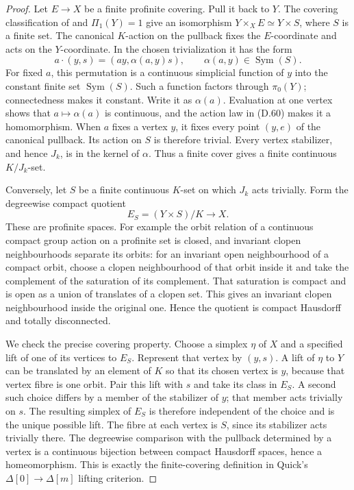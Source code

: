 \begin{proof}
Let $E\to X$ be a finite profinite covering.  Pull it
back to $Y$.  The covering classification of
\cite[\S2.1, Proposition 2.2]{D_Quick2008} and
$\Pi_1(Y)=1$ give an isomorphism
$Y\times_X E\simeq Y\times S$, where $S$ is a finite
set.  The canonical $K$-action on the pullback fixes
the $E$-coordinate and acts on the $Y$-coordinate.
In the chosen trivialization it has the form
\[
       a\cdot(y,s)=(ay,\alpha(a,y)s),
       \qquad \alpha(a,y)\in\operatorname{Sym}(S).           \tag{D.60}
\]
For fixed $a$, this permutation is a continuous
simplicial function of $y$ into the constant finite
set $\operatorname{Sym}(S)$.  Such a function factors
through $\pi_0(Y)$; connectedness makes it constant.
Write it as $\alpha(a)$.  Evaluation at one vertex
shows that $a\mapsto\alpha(a)$ is continuous, and
the action law in (D.60) makes it a homomorphism.
When $a$ fixes a vertex $y$, it fixes every point
$(y,e)$ of the canonical pullback.  Its action on
$S$ is therefore trivial.  Every vertex stabilizer,
and hence $J_k$, is in the kernel of $\alpha$.
Thus a finite cover gives a finite continuous
$K/J_k$-set.

Conversely, let $S$ be a finite continuous $K$-set
on which $J_k$ acts trivially.  Form the degreewise
compact quotient
\[
                       E_S=(Y\times S)/K\longrightarrow X.
\]
These are profinite spaces.  For example the orbit
relation of a continuous compact group action on
a profinite set is closed, and invariant clopen
neighbourhoods separate its orbits: for an invariant
open neighbourhood of a compact orbit, choose a
clopen neighbourhood of that orbit inside it and
take the complement of the saturation of its
complement.  That saturation is compact and is
open as a union of translates of a clopen set.
This gives an invariant clopen
neighbourhood inside the original one.  Hence the
quotient is compact Hausdorff and totally disconnected.

We check the precise covering property.  Choose
a simplex $\eta$ of $X$ and a specified lift of
one of its vertices to $E_S$.  Represent that
vertex by $(y,s)$.  A lift of $\eta$ to $Y$ can
be translated by an element of $K$ so that its
chosen vertex is $y$, because that vertex fibre
is one orbit.  Pair this lift with $s$ and take
its class in $E_S$.  A second such choice differs
by a member of the stabilizer of $y$; that member
acts trivially on $s$.  The resulting simplex of
$E_S$ is therefore independent of the choice
and is the unique possible lift.  The fibre at
each vertex is $S$, since its stabilizer acts
trivially there.  The degreewise comparison with
the pullback determined by a vertex is a
continuous bijection between compact Hausdorff
spaces, hence a homeomorphism.  This is exactly
the finite-covering definition in Quick's
$\Delta[0]\to\Delta[m]$ lifting criterion.


\end{proof}
